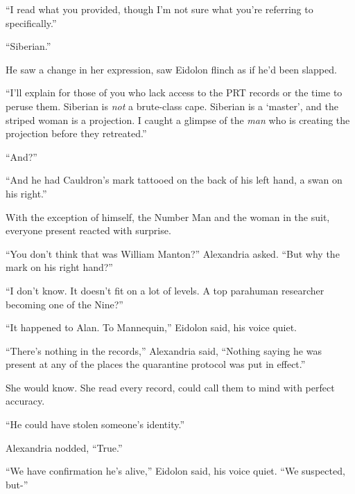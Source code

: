 ``I read what you provided, though I'm not sure what you're referring to specifically.''



``Siberian.''



He saw a change in her expression, saw Eidolon flinch as if he'd been slapped.



``I'll explain for those of you who lack access to the PRT records or the time to peruse them.  Siberian is \emph{not} a brute-class cape.  Siberian is a `master', and the striped woman is a projection.  I caught a glimpse of the \emph{man }who is creating the projection before they retreated.''



``And?''



``And he had Cauldron's mark tattooed on the back of his left hand, a swan on his right.''



With the exception of himself, the Number Man and the woman in the suit, everyone present reacted with surprise.



``You don't think that was William Manton?''  Alexandria asked.  ``But why the mark on his right hand?''



``I don't know.  It doesn't fit on a lot of levels.  A top parahuman researcher becoming one of the Nine?''



``It happened to Alan.  To Mannequin,'' Eidolon said, his voice quiet.



``There's nothing in the records,'' Alexandria said, ``Nothing saying he was present at any of the places the quarantine protocol was put in effect.''



She would know.  She read every record, could call them to mind with perfect accuracy.



``He could have stolen someone's identity.''



Alexandria nodded, ``True.''



``We have confirmation he's alive,'' Eidolon said, his voice quiet.  ``We suspected, but-''



